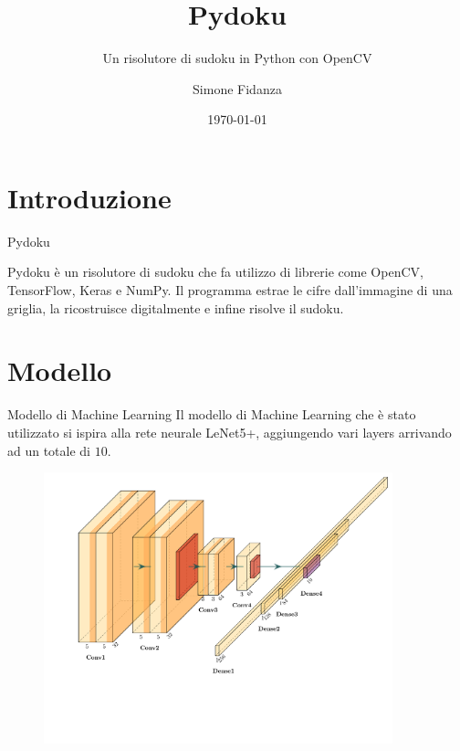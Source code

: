 \documentclass[10pt]{beamer}
\title{Pydoku}
\subtitle{Un risolutore di sudoku in Python con OpenCV}
\date{\today}
\author{Simone Fidanza}
\institute{Università degli studi di Bari ``Aldo Moro''}
\begin{document}
\maketitle

\section[Introduzione]{Introduzione}

\begin{frame}[fragile]{Pydoku}

    Pydoku è un risolutore di sudoku che fa utilizzo di librerie come OpenCV,
    TensorFlow, Keras e NumPy. Il programma estrae le cifre dall'immagine di
    una griglia, la ricostruisce digitalmente e infine risolve il sudoku.

\end{frame}

\section{Modello}

\begin{frame}{Modello di Machine Learning}
    Il modello di Machine Learning che è stato utilizzato si ispira alla rete
    neurale LeNet5+, aggiungendo vari layers arrivando ad un totale di \(10\).\\

    \begin{figure}
        \includegraphics[width=0.9\textwidth, trim = 1cm 4.5cm 0cm 1cm]{architecture.pdf}
    \end{figure}

\end{frame}
\end{document}
